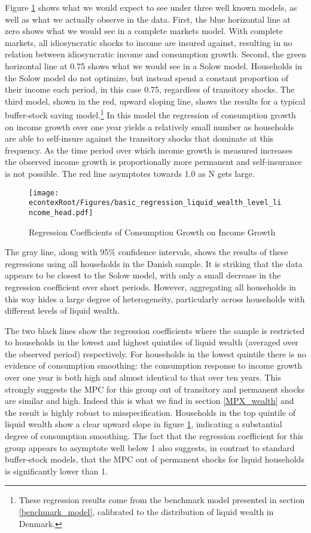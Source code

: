 \documentclass[titlepage]{\econtex}\newcommand{\texname}{ConsumptionHeterogeneity}
\begin{document}
Figure \ref{fig:GrowthReg} shows what we would expect to see under three well known models, as well as what we actually observe in the data. First, the blue horizontal line at zero shows what we would see in a complete markets model. With complete markets, all idiosyncratic shocks to income are insured against, resulting in no relation between idiosyncratic income and consumption growth. Second, the green horizontal line at 0.75 shows what we would see in a Solow model. Households in the Solow model do not optimize, but instead spend a constant proportion of their income each period, in this case 0.75, regardless of transitory shocks. The third model, shown in the red, upward sloping line, shows the results for a typical buffer-stock saving model.\footnote{These regression results come from the benchmark model presented in section \ref{benchmark_model}, calibrated to the distribution of liquid wealth in Denmark.} In this model the regression of consumption growth on income growth over one year yields a relatively small number as households are able to self-insure against the transitory shocks that dominate at this frequency. As the time period over which income growth is measured increases the observed income growth is proportionally more permanent and self-insurance is not possible. The red line asymptotes towards 1.0 as N gets large.
	\begin{figure} 
	\begin{centering}
		\texttt{[image: \\econtexRoot/Figures/basic\_regression\_liquid\_wealth\_level\_lincome\_head.pdf]}
		\caption{Regression Coefficients of Consumption Growth on Income Growth}
		\label{fig:GrowthReg}
	\end{centering}
\end{figure}

The gray line, along with 95\% confidence intervals, shows the results of these regressions using all households in the Danish sample. It is striking that the data appears to be closest to the Solow model, with only a small decrease in the regression coefficient over short periods. However, aggregating all households in this way hides a large degree of heterogeneity, particularly across households with different levels of liquid wealth.

The two black lines show the regression coefficients where the sample is restricted to households in the lowest and highest quintiles of liquid wealth (averaged over the observed period) respectively. For households in the lowest quintile there is no evidence of consumption smoothing: the consumption response to income growth over one year is both high and almost identical to that over ten years. This strongly suggests the MPC for this group out of transitory and permanent shocks are similar and high. Indeed this is what we find in section \ref{MPX_wealth} and the result is highly robust to misspecification. Households in the top quintile of liquid wealth show a clear upward slope in figure \ref{fig:GrowthReg}, indicating a substantial degree of consumption smoothing. The fact that the regression coefficient for this group appears to asymptote well below 1 also suggests, in contrast to standard buffer-stock models, that the MPC out of permanent shocks for liquid households is significantly lower than 1.
\end{document}
